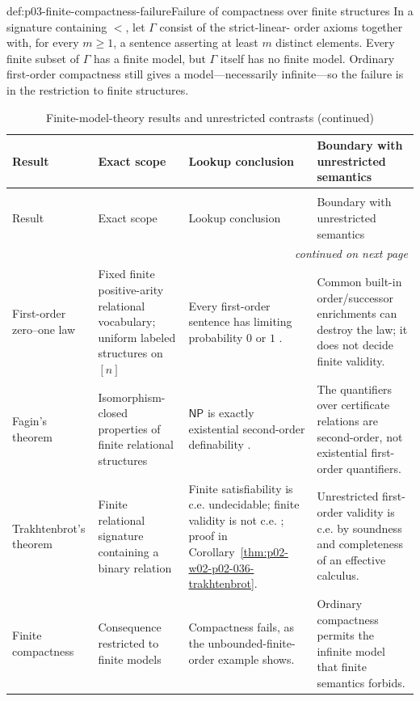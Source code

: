 \begin{hbexample}{def:p03-finite-compactness-failure}{Failure of compactness over finite structures}
In a signature containing \(<\), let \(\Gamma\) consist of the strict-linear-
order axioms together with, for every \(m\geq1\), a sentence asserting at least
\(m\) distinct elements.  Every finite subset of \(\Gamma\) has a finite
model, but \(\Gamma\) itself has no finite model.  Ordinary first-order
compactness still gives a model---necessarily infinite---so the failure is in
the restriction to finite structures.
\end{hbexample}

\begin{landscape}
\begingroup\small\setlength{\tabcolsep}{4pt}
\begin{longtable}{@{}p{1.22in}p{1.62in}p{2.25in}p{2.06in}@{}}
\caption{Finite-model-theory results and unrestricted contrasts.}
\label{tab:p03-finite-model-theory}\\
\toprule
Result & Exact scope & Lookup conclusion & Boundary with unrestricted semantics \\
\midrule\endfirsthead
\caption[]{Finite-model-theory results and unrestricted contrasts (continued)}\\
\toprule
Result & Exact scope & Lookup conclusion & Boundary with unrestricted semantics \\
\midrule\endhead
\midrule\multicolumn{4}{r}{\emph{continued on next page}}\\
\endfoot
\endlastfoot
First-order zero--one law & Fixed finite positive-arity relational vocabulary; uniform labeled structures on \([n]\) & Every first-order sentence has limiting probability \(0\) or \(1\) \cite{GlebskiiEtAl1969,Fagin1976}. & Common built-in order/successor enrichments can destroy the law; it does not decide finite validity. \\
\addlinespace
Fagin's theorem & Isomorphism-closed properties of finite relational structures & \(\mathsf{NP}\) is exactly existential second-order definability \cite{Fagin1974}. & The quantifiers over certificate relations are second-order, not existential first-order quantifiers. \\
\addlinespace
Trakhtenbrot's theorem & Finite relational signature containing a binary relation & Finite satisfiability is c.e. undecidable; finite validity is not c.e. \cite{Trakhtenbrot1950}; proof in Corollary~\ref{thm:p02-w02-p02-036-trakhtenbrot}. & Unrestricted first-order validity is c.e. by soundness and completeness of an effective calculus. \\
\addlinespace
Finite compactness & Consequence restricted to finite models & Compactness fails, as the unbounded-finite-order example shows. & Ordinary compactness permits the infinite model that finite semantics forbids. \\
\bottomrule
\end{longtable}
\endgroup
\end{landscape}


